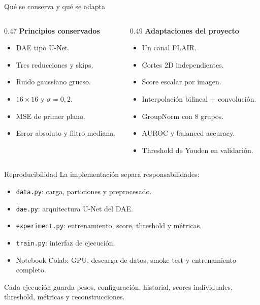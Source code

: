 \documentclass[10pt,aspectratio=169]{beamer}
\begin{document}
\begin{frame}{Qué se conserva y qué se adapta}
  \begin{columns}[T]
    \begin{column}{0.47\textwidth}
      \textbf{Principios conservados}
      \begin{itemize}
        \item DAE tipo U-Net.
        \item Tres reducciones y skips.
        \item Ruido gaussiano grueso.
        \item $16\times16$ y $\sigma=0{,}2$.
        \item MSE de primer plano.
        \item Error absoluto y filtro mediana.
      \end{itemize}
    \end{column}
    \begin{column}{0.49\textwidth}
      \textbf{Adaptaciones del proyecto}
      \begin{itemize}
        \item Un canal FLAIR.
        \item Cortes 2D independientes.
        \item Score escalar por imagen.
        \item Interpolación bilineal + convolución.
        \item GroupNorm con 8 grupos.
        \item AUROC y balanced accuracy.
        \item Threshold de Youden en validación.
      \end{itemize}
    \end{column}
  \end{columns}
\end{frame}

\begin{frame}{Reproducibilidad}
  La implementación separa responsabilidades:
  \begin{itemize}
    \item \texttt{data.py}: carga, particiones y preprocesado.
    \item \texttt{dae.py}: arquitectura U-Net del DAE.
    \item \texttt{experiment.py}: entrenamiento, score, threshold y métricas.
    \item \texttt{train.py}: interfaz de ejecución.
    \item Notebook Colab: GPU, descarga de datos, smoke test y entrenamiento completo.
  \end{itemize}

  \vspace{0.2cm}
  Cada ejecución guarda pesos, configuración, historial, scores individuales,
  threshold, métricas y reconstrucciones.
\end{frame}
\end{document}
